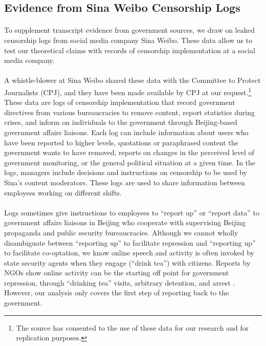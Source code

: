 \documentclass[12pt]{article}
\begin{document}
\begin{CJK*}{UTF8}{gbsn}
\subsection{Evidence from Sina Weibo Censorship Logs}

\paragraph{} To supplement transcript evidence from government sources, we draw on leaked censorship logs from social media company Sina Weibo. These data allow us to test our theoretical claims with records of censorship implementation at a social media company.

\paragraph{} A whistle-blower at Sina Weibo shared these data with the Committee to Protect Journalists (CPJ), and they have been made available by CPJ at our request.\footnote{The source has consented to the use of these data for our research and for replication purposes.} These data are logs of censorship implementation that record government directives from various bureaucracies to remove content, report statistics during crises, and inform on individuals to the government through Beijing-based government affairs liaisons. Each log can include information about users who have been reported to higher levels, quotations or paraphrased content the government wants to have removed, reports on changes in the perceived level of government monitoring, or the general political situation at a given time. In the logs, managers include decisions and instructions on censorship to be used by Sina's content moderators. These logs are used to share information between employees working on different shifts.

\paragraph{} Logs sometimes give instructions to employees to ``report up'' or ``report data'' to government affairs liaisons in Beijing who cooperate with supervising Beijing propaganda and public security bureaucracies. Although we cannot wholly disambiguate between ``reporting up'' to facilitate repression and ``reporting up'' to facilitate co-optation, we know online speech and activity is often invoked by state security agents when they engage (``drink tea'') with citizens. Reports by NGOs show online activity can be the starting off point for government repression, through ``drinking tea'' visits, arbitrary detention, and arrest \citep{tager2017forbidden}. However, our analysis only covers the first step of reporting back to the government.


\end{CJK*}
\end{document}
